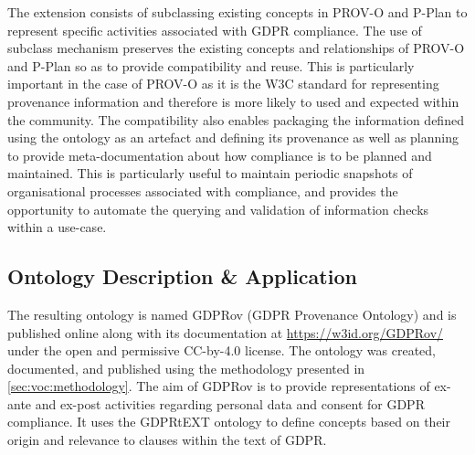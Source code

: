 The extension consists of subclassing existing concepts in PROV-O and P-Plan to represent specific activities associated with GDPR compliance. 
The use of subclass mechanism preserves the existing concepts and relationships of PROV-O and P-Plan so as to provide compatibility and reuse. This is particularly important in the case of PROV-O as it is the W3C standard for representing provenance information and therefore is more likely to used and expected within the community.
The compatibility also enables packaging the information defined using the ontology as an artefact and defining its provenance as well as planning to provide meta-documentation about how compliance is to be planned and maintained. This is particularly useful to maintain periodic snapshots of organisational processes associated with compliance, and provides the opportunity to automate the querying and validation of information checks within a use-case.

\subsection{Ontology Description \& Application}
The resulting ontology is named GDPRov (GDPR Provenance Ontology) and is published online along with its documentation at \url{https://w3id.org/GDPRov/} under the open and permissive CC-by-4.0 license.
The ontology was created, documented, and published using the methodology presented in \autoref{sec:voc:methodology}.
The aim of GDPRov is to provide representations of ex-ante and ex-post activities regarding personal data and consent for GDPR compliance.
It uses the GDPRtEXT ontology to define concepts based on their origin and relevance to clauses within the text of GDPR.

